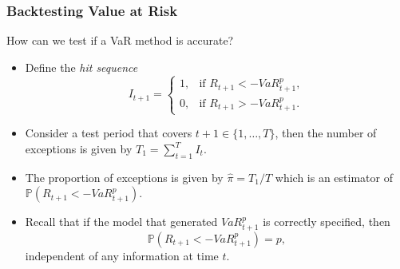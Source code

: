 \begin{frame}%

\frametitle{Backtesting Value at Risk}

How can we test if a VaR method is accurate?

\begin{itemize}
\item Define the \emph{\color{red}hit sequence}%
\begin{equation*}
I_{t+1}=\left\{
\begin{array}{cc}
1, & \text{if }R_{t+1}<-VaR_{t+1}^{p}, \\
0, & \text{if }R_{t+1}>-VaR_{t+1}^{p}.%
\end{array}%
\right.
\end{equation*}

\item Consider a test period that covers $t+1\in \{1,\ldots ,T\}$, then the
number of exceptions is given by $T_{1}=\sum_{t=1}^{T}I_{t}.$

\item The proportion of exceptions is given by $\hat{\pi}=T_{1}/T$ which is
an estimator of $\mathbb{P} \left ( R_{t+1}<-VaR_{t+1}^{p}\right )$.

\item Recall that if the model that generated $VaR_{t+1}^{p}$ is correctly
specified, then
\begin{equation*}
\mathbb{P} \left ( R_{t+1}<-VaR_{t+1}^{p}\right ) =p,
\end{equation*}
independent of any information at time $t$.
\end{itemize}

\end{frame}%

